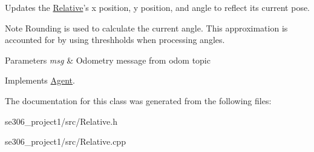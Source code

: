 Updates the \hyperlink{classRelative}{Relative}'s x position, y position, and angle to reflect its current pose. 

\begin{DoxyNote}{Note}
Rounding is used to calculate the current angle. This approximation is accounted for by using threshholds when processing angles. 
\end{DoxyNote}

\begin{DoxyParams}{Parameters}
{\em msg} & Odometry message from odom topic \\
\hline
\end{DoxyParams}


Implements \hyperlink{classAgent_a4b1182b9ee5dccaa871d71beef94a7d2}{Agent}.



The documentation for this class was generated from the following files\-:\begin{DoxyCompactItemize}
\item 
se306\-\_\-project1/src/Relative.\-h\item 
se306\-\_\-project1/src/Relative.\-cpp\end{DoxyCompactItemize}
